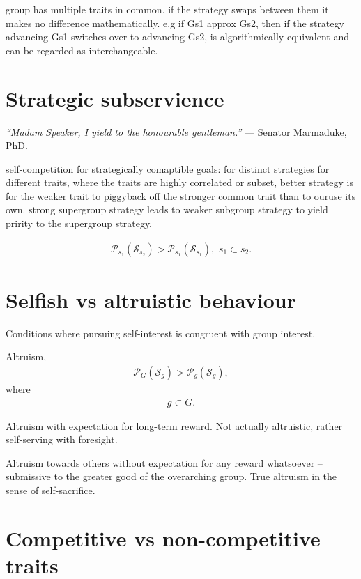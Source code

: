 \documentclass[twocolumn, aps, rmp, amsmath, amssymb, nofootinbib, superscriptaddress, longbibliography, floatfix, table-of-contents, eqsecnum]{revtex4-1}
\newcommand{\famousquote}[2]{{\textit{``#1''} --- #2.}\newline}
\begin{document}
group has multiple traits in common. if the strategy swaps between them it makes no difference mathematically. e.g if Gs1 approx Gs2, then if the strategy advancing Gs1 switches over to advancing Gs2, is algorithmically equivalent and can be regarded as interchangeable.

\section{Strategic subservience}

\famousquote{Madam Speaker, I yield to the honourable gentleman.}{Senator Marmaduke, PhD}

self-competition for strategically comaptible goals:
for distinct strategies for different traits, where the traits are highly correlated or subset, better strategy is for the weaker trait to piggyback off the stronger common trait than to ouruse its own. strong supergroup strategy leads to weaker subgroup strategy to yield pririty to the supergroup strategy.

\begin{align}
\mathcal{P}_{s_1}(\mathcal{S}_{s_2}) > \mathcal{P}_{s_1}(\mathcal{S}_{s_1}), \,\,s_1\subset s_2.
\end{align}

\section{Selfish vs altruistic behaviour}

Conditions where pursuing self-interest is congruent with group interest.

Altruism,
\begin{align}
\mathcal{P}_G(\mathcal{S}_g) > \mathcal{P}_g(\mathcal{S}_g),
\end{align}
where
\begin{align}
	g \subset G.
\end{align}

Altruism with expectation for long-term reward. Not actually altruistic, rather self-serving with foresight.

Altruism towards others without expectation for any reward whatsoever -- submissive to the greater good of the overarching group. True altruism in the sense of self-sacrifice.

\section{Competitive vs non-competitive traits}
\end{document}

